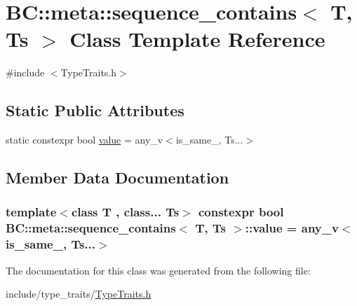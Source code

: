 \hypertarget{classBC_1_1meta_1_1sequence__contains}{}\section{BC\+:\+:meta\+:\+:sequence\+\_\+contains$<$ T, Ts $>$ Class Template Reference}
\label{classBC_1_1meta_1_1sequence__contains}


{\ttfamily \#include $<$Type\+Traits.\+h$>$}

\subsection*{Static Public Attributes}
\begin{DoxyCompactItemize}
\item 
static constexpr bool \hyperlink{classBC_1_1meta_1_1sequence__contains_a13f22469d2adf2d03d4846e08bee644c}{value} = any\+\_\+v$<$is\+\_\+same\+\_\+, Ts...$>$
\end{DoxyCompactItemize}


\subsection{Member Data Documentation}
\subsubsection[{\texorpdfstring{value}{value}}]{\setlength{\rightskip}{0pt plus 5cm}template$<$class T , class... Ts$>$ constexpr bool {\bf B\+C\+::meta\+::sequence\+\_\+contains}$<$ T, Ts $>$\+::value = any\+\_\+v$<$is\+\_\+same\+\_\+, Ts...$>$\hspace{0.3cm}{\ttfamily [static]}}\hypertarget{classBC_1_1meta_1_1sequence__contains_a13f22469d2adf2d03d4846e08bee644c}{}\label{classBC_1_1meta_1_1sequence__contains_a13f22469d2adf2d03d4846e08bee644c}


The documentation for this class was generated from the following file\+:\begin{DoxyCompactItemize}
\item 
include/type\+\_\+traits/\hyperlink{TypeTraits_8h}{Type\+Traits.\+h}\end{DoxyCompactItemize}
